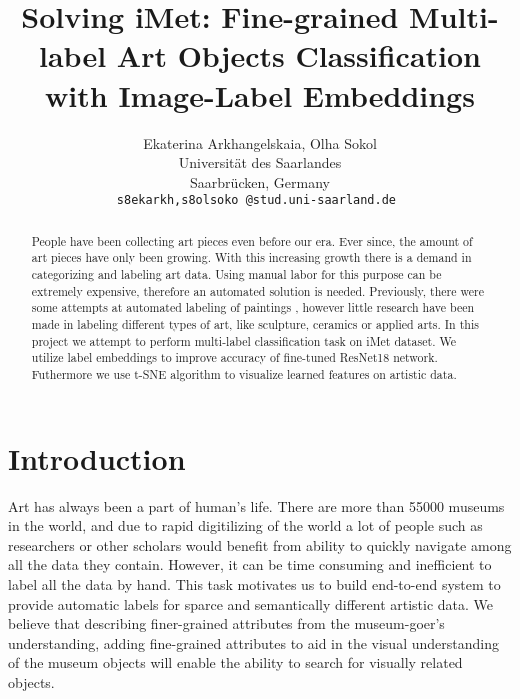 \documentclass[10pt,twocolumn,letterpaper]{article}
\begin{document}
\title{Solving iMet: Fine-grained Multi-label Art Objects Classification with Image-Label Embeddings}

\author{Ekaterina Arkhangelskaia, Olha Sokol\\
Universit{\"a}t des Saarlandes\\
Saarbr{\"u}cken, Germany\\
{\tt\small s8ekarkh,s8olsoko @stud.uni-saarland.de }
}

\maketitle

\begin{abstract}
   People have been collecting art pieces even before our era. Ever since, the amount of art pieces have only been growing. With this increasing growth there is a demand in categorizing and labeling art data. Using manual labor for this purpose can be extremely expensive, therefore an automated solution is needed. Previously, there were some attempts at automated labeling of paintings \cite{Rijksmuseum}, however little research have been made in labeling different types of art, like sculpture, ceramics or applied arts. 
   In this project we attempt to perform multi-label classification task on iMet dataset. We utilize label embeddings to improve accuracy of fine-tuned ResNet18 network. Futhermore we use t-SNE algorithm to visualize learned features on artistic data. 

\end{abstract}

\section{Introduction}
Art has always been a part of human's life. There are more than 55000 museums in the world, and due to rapid digitilizing of the world a lot of people such as researchers or other scholars would benefit from ability to quickly  navigate among all the data they contain. However, it can be time consuming and inefficient to label all the data by hand. This task motivates us to build end-to-end system to provide automatic labels for sparce and semantically different artistic data. We believe that describing finer-grained attributes from the museum-goer’s understanding, adding fine-grained attributes to aid in the visual understanding of the museum objects will enable the ability to search for visually related objects.
\end{document}
